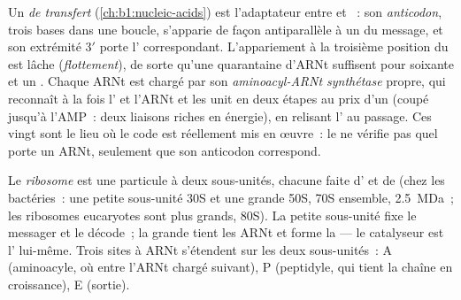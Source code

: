 \begin{definition}\label{def:b1:gene-expression:trna}
Un \emph{ de transfert} (\cref{ch:b1:nucleic-acids}) est l'adaptateur
entre  et ~: son \emph{anticodon}, trois bases dans une
boucle, s'apparie de façon antiparallèle à un  du message, et son
extrémité $3'$ porte l' correspondant. L'appariement à la
troisième position du  est lâche (\emph{flottement}), de sorte
qu'une quarantaine d'ARNt suffisent pour soixante et un . Chaque
ARNt est chargé par son \emph{aminoacyl-ARNt synthétase} propre, 
qui reconnaît à la fois l' et l'ARNt et les unit en deux
étapes au prix d'un  (coupé jusqu'à l'AMP~: deux liaisons riches en
énergie), en relisant l' au passage. Ces vingt  sont
le lieu où le code est réellement mis en œuvre~: le  ne vérifie
pas quel  porte un ARNt, seulement que son anticodon
correspond.
\end{definition}

\begin{definition}[Le ribosome]\label{def:b1:gene-expression:ribosome}
Le \emph{ribosome} est une particule à deux sous-unités, chacune faite
d' et de  (chez les bactéries~: une petite
sous-unité 30S et une grande 50S, 70S ensemble, \qty{2.5}{MDa}~; les
ribosomes eucaryotes sont plus grands, 80S). La petite sous-unité fixe
le messager et le décode~; la grande tient les ARNt et forme la  --- le catalyseur est l' lui-même. Trois sites
à ARNt s'étendent sur les deux sous-unités~: A (aminoacyle, où entre
l'ARNt chargé suivant), P (peptidyle, qui tient la chaîne en
croissance), E (sortie).
\end{definition}

